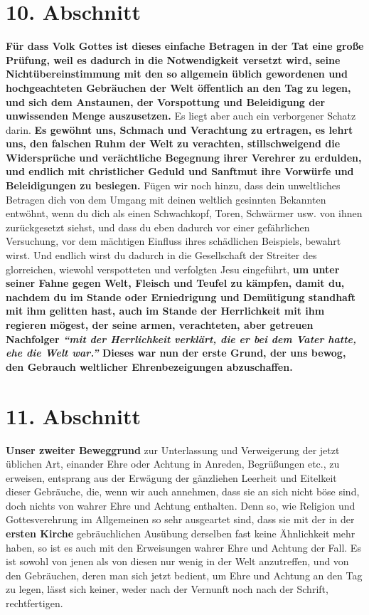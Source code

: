 \section{10. Abschnitt} \label{kap9_ab10}

\label{ref:09_10_spott} \textbf{Für dass Volk Gottes ist dieses einfache
Betragen in der Tat
eine große
Prüfung,
weil es dadurch in die Notwendigkeit versetzt wird, seine Nichtübereinstimmung
mit den so allgemein üblich gewordenen und hochgeachteten Gebräuchen der Welt
öffentlich an den Tag zu legen, und sich dem Anstaunen, der Vorspottung und
Beleidigung der unwissenden Menge auszusetzen.} Es liegt aber auch ein
verborgener Schatz darin. \textbf{Es gewöhnt uns, Schmach und Verachtung zu
ertragen,
es lehrt uns, den falschen Ruhm der Welt zu verachten,
stillschweigend die
Widersprüche und verächtliche Begegnung ihrer Verehrer zu erdulden, und endlich
mit christlicher Geduld und Sanftmut ihre Vorwürfe und Beleidigungen zu
besiegen.} Fügen wir noch hinzu, dass dein unweltliches Betragen dich von dem
Umgang mit deinen weltlich gesinnten Bekannten entwöhnt, wenn
du dich als einen
Schwachkopf, Toren, Schwärmer usw. von ihnen zurückgesetzt siehst, und dass
du eben dadurch vor einer gefährlichen Versuchung, vor dem mächtigen Einfluss
ihres schädlichen Beispiels, bewahrt wirst. Und endlich wirst du dadurch in
die Gesellschaft der Streiter des glorreichen, wiewohl verspotteten und
verfolgten Jesu eingeführt, \textbf{um unter seiner Fahne
gegen Welt, Fleisch und Teufel
zu kämpfen, damit du, nachdem du im Stande oder Erniedrigung und Demütigung
standhaft mit ihm gelitten hast, auch im Stande der Herrlichkeit mit ihm
regieren mögest, der seine armen, verachteten, aber getreuen Nachfolger
\textit{"`mit der Herrlichkeit verklärt, die er bei dem Vater hatte, ehe die
Welt
war."'}
Dieses war nun der erste Grund, der uns bewog, den
Gebrauch weltlicher Ehrenbezeigungen abzuschaffen.}

\section{11. Abschnitt} \label{kap9_ab11}

\textbf{Unser zweiter Beweggrund} zur Unterlassung und Verweigerung der jetzt
üblichen
Art, einander Ehre oder Achtung in Anreden, Begrüßungen etc., zu erweisen,
entsprang aus der Erwägung der gänzliehen Leerheit und Eitelkeit dieser
Gebräuche, die, wenn wir auch annehmen, dass sie an sich nicht böse sind, doch
nichts von wahrer Ehre und Achtung enthalten. Denn so, wie Religion und
Gottesverehrung im Allgemeinen so sehr ausgeartet sind, dass sie mit der in der
\textbf{ersten Kirche} gebräuchlichen Ausübung derselben
fast keine Ähnlichkeit mehr
haben, so ist es auch mit den Erweisungen wahrer Ehre und Achtung der Fall. Es
ist sowohl von jenen als von diesen nur wenig in der Welt anzutreffen, und von
den Gebräuchen, deren man sich jetzt bedient, um Ehre und Achtung an den Tag zu
legen, lässt sich keiner, weder nach der Vernunft noch nach der Schrift,
rechtfertigen.

